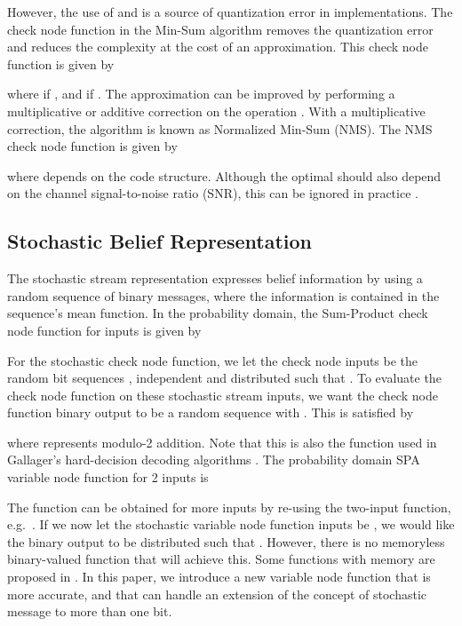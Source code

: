 \documentclass[12pt,journal,twoside,draftcls,onecolumn]{IEEEtran}
\begin{document}
However, the use of  and  is a source of quantization error in implementations.
The check node function in the Min-Sum algorithm \cite{fossorier:1999} removes the quantization error and reduces the complexity at the cost of an approximation. This check node function is given by

where
\ifCLASSOPTIONdraftcls
 if , and  if .
\else 
\fi
The approximation can be improved by performing a multiplicative or additive correction on the  operation \cite{chen:2002,zhao:2005}. 
With a multiplicative correction, the algorithm is known as Normalized Min-Sum (NMS). The NMS check node function is given by

where  depends on the code structure. Although the optimal  should also depend on the channel signal-to-noise ratio (SNR), this can be ignored in practice \cite{chen:2002}.

\subsection{Stochastic Belief Representation}
\label{sect_background_stoch}

The stochastic stream representation expresses belief information by using a random sequence of binary messages, where the information is contained in the sequence's mean function.
In the probability domain, the Sum-Product check node function for  inputs is given by \cite{gallager:1963}

For the stochastic check node function, we let the check node inputs be the random bit sequences , independent and distributed such that .
To evaluate the check node function on these stochastic stream inputs, we want the check node function binary output  to be a random sequence with .
This is satisfied by

where  represents modulo-2 addition.
Note that this is also the function used in Gallager's hard-decision decoding algorithms \cite{gallager:1963}.
The probability domain SPA variable node function for 2 inputs is

The function can be obtained for more inputs by re-using the two-input function, e.g.~.
If we now let the stochastic variable node function inputs be , we would like the binary output  to be distributed such that . However, there is no memoryless binary-valued function that will achieve this.
Some functions with memory are proposed in \cite{rapley:2003,sharifi-tehrani:2010}.
In this paper, we introduce a new variable node function that is more accurate, and that can handle an extension of the concept of stochastic message to more than one bit.
\end{document}
